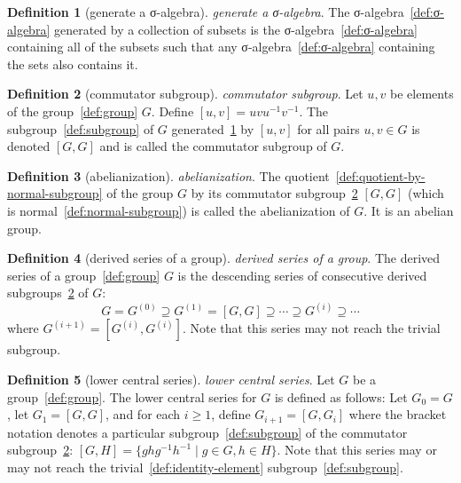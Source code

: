 \documentclass[12pt,a4paper]{article}
\theoremstyle{definition}
\newtheorem{definition}{Definition}
\begin{document}
\begin{definition}[generate a σ-algebra]\label{def:generate-a-σ-algebra}
\emph{generate a σ-algebra}. The σ-algebra~\ref{def:σ-algebra} generated by a collection of subsets is the σ-algebra~\ref{def:σ-algebra} containing all of the subsets such that any σ-algebra~\ref{def:σ-algebra} containing the sets also contains it.
\end{definition}

\begin{definition}[commutator subgroup]\label{def:commutator-subgroup}
\emph{commutator subgroup}. Let $u,v$ be elements of the group~\ref{def:group} $G$. Define $[u,v] = uvu^{-1}v^{-1}$. The subgroup~\ref{def:subgroup} of $G$ generated~\ref{def:generate-a-σ-algebra} by $[u,v]$ for all pairs $u,v\in G$ is denoted $[G,G]$ and is called the commutator subgroup of $G$.
\end{definition}

\begin{definition}[abelianization]\label{def:abelianization}
\emph{abelianization}. The quotient~\ref{def:quotient-by-normal-subgroup} of the group $G$ by its commutator subgroup~\ref{def:commutator-subgroup} $[G,G]$ (which is normal~\ref{def:normal-subgroup}) is called the abelianization of $G$. It is an abelian group.
\end{definition}

\begin{definition}[derived series of a group]\label{def:derived-series-of-a-group}
\emph{derived series of a group}. The derived series of a group~\ref{def:group} $G$ is the descending series of consecutive derived subgroups~\ref{def:commutator-subgroup} of $G$: $$G = G^{(0)} \supseteq G^{(1)} = [G,G] \supseteq \cdots \supseteq G^{(i)}\supseteq \cdots$$ where $G^{(i+1)} = [G^{(i)},G^{(i)}]$. Note that this series may not reach the trivial subgroup.
\end{definition}

\begin{definition}[lower central series]\label{def:lower-central-series}
\emph{lower central series}. Let $G$ be a group~\ref{def:group}. The lower central series for $G$ is defined as follows: Let $G_0=G$, let $G_1 = [G,G]$, and for each $i \geq 1$, define $G_{i+1} = [G,G_{i}]$ where the bracket notation denotes a particular subgroup~\ref{def:subgroup} of the commutator subgroup~\ref{def:commutator-subgroup}: $[G,H] = \{ghg^{-1}h^{-1}\mid g\in G, h\in H\}$. Note that this series may or may not reach the trivial~\ref{def:identity-element} subgroup~\ref{def:subgroup}.
\end{definition}
\end{document}
